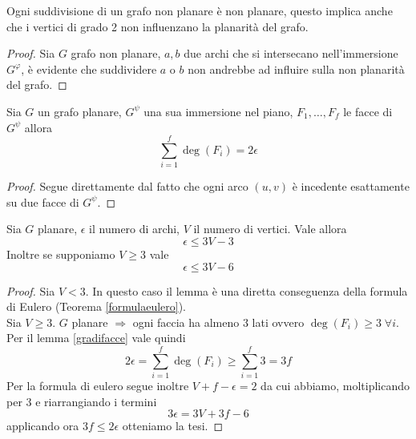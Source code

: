 \begin{proposizione}
    Ogni suddivisione di un grafo non planare è non planare, questo implica anche che i vertici di grado 2 non influenzano la planarità del grafo.
    \begin{proof}
        Sia \(G\) grafo non planare, \(a,b\) due archi che si intersecano nell'immersione \(G^\varphi\), è evidente che suddividere \(a\) o \(b\) non andrebbe ad influire sulla non planarità del grafo.
    \end{proof}
\end{proposizione}

\begin{lemma}\label{gradifacce}
    Sia \(G\) un grafo planare, \(G^\psi\) una sua immersione nel piano, \(F_1, \dots, F_f\) le facce di \(G^\psi\) allora
    \begin{equation}
        \sum_{i=1}^f \deg(F_i) = 2\epsilon
    \end{equation}
    \begin{proof}
        Segue direttamente dal fatto che ogni arco \((u,v)\) è incedente esattamente su due facce di \(G^\psi\).
    \end{proof}
\end{lemma}

\begin{proposizione}\label{criterioNonPlan}
    Sia \(G\) planare, \(\epsilon\) il numero di archi, \(V\) il numero di vertici. Vale allora
    \begin{equation}
        \epsilon \leq 3V - 3
    \end{equation}
    Inoltre se supponiamo \(V \geq 3\) vale
    \begin{equation}
        \epsilon \leq 3V - 6
    \end{equation}
    \begin{proof}
        Sia \(V<3\). In questo caso il lemma è una diretta conseguenza della formula di Eulero (Teorema {\ref{formulaeulero}}). \\
        Sia \(V\geq 3\). \(G\) planare \(\Rightarrow\) ogni faccia ha almeno 3 lati ovvero \(\deg(F_i) \geq 3\; \forall i\). Per il lemma {\ref{gradifacce}} vale quindi
        \begin{equation}
            2\epsilon = \sum_{i=1}^f \deg(F_i) \geq \sum_{i=1}^f 3 = 3f
        \end{equation}
        Per la formula di eulero segue inoltre \(V+f-\epsilon = 2\) da cui abbiamo, moltiplicando per 3 e riarrangiando i termini
        \begin{equation}
            3\epsilon = 3V + 3f - 6
        \end{equation}
        applicando ora \(3f\leq 2 \epsilon\) otteniamo la tesi.
    \end{proof}
\end{proposizione}

